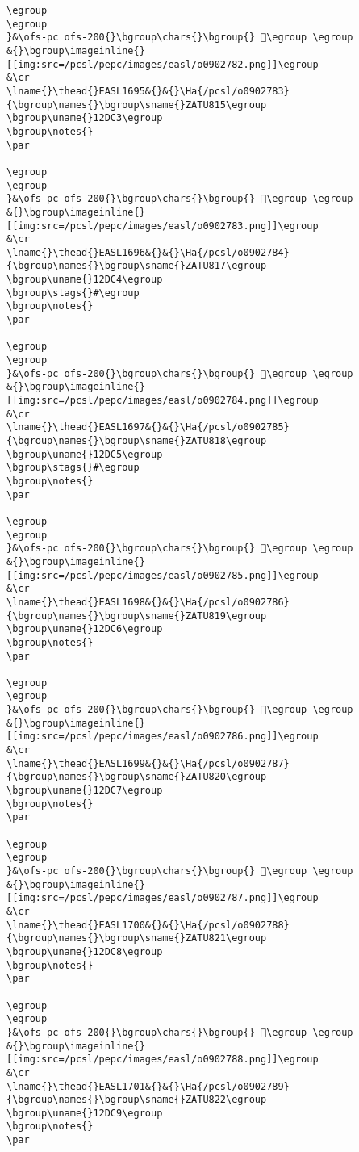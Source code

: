 \begin{verbatim}
\egroup
\egroup
}&\ofs-pc ofs-200{}\bgroup\chars{}\bgroup{} 𒷂\egroup \egroup
&{}\bgroup\imageinline{}[[img:src=/pcsl/pepc/images/easl/o0902782.png]]\egroup
&\cr
\lname{}\thead{}EASL1695&{}&{}\Ha{/pcsl/o0902783}{\bgroup\names{}\bgroup\sname{}ZATU815\egroup
\bgroup\uname{}12DC3\egroup
\bgroup\notes{}
\par 

\egroup
\egroup
}&\ofs-pc ofs-200{}\bgroup\chars{}\bgroup{} 𒷃\egroup \egroup
&{}\bgroup\imageinline{}[[img:src=/pcsl/pepc/images/easl/o0902783.png]]\egroup
&\cr
\lname{}\thead{}EASL1696&{}&{}\Ha{/pcsl/o0902784}{\bgroup\names{}\bgroup\sname{}ZATU817\egroup
\bgroup\uname{}12DC4\egroup
\bgroup\stags{}#\egroup
\bgroup\notes{}
\par 

\egroup
\egroup
}&\ofs-pc ofs-200{}\bgroup\chars{}\bgroup{} 𒷄\egroup \egroup
&{}\bgroup\imageinline{}[[img:src=/pcsl/pepc/images/easl/o0902784.png]]\egroup
&\cr
\lname{}\thead{}EASL1697&{}&{}\Ha{/pcsl/o0902785}{\bgroup\names{}\bgroup\sname{}ZATU818\egroup
\bgroup\uname{}12DC5\egroup
\bgroup\stags{}#\egroup
\bgroup\notes{}
\par 

\egroup
\egroup
}&\ofs-pc ofs-200{}\bgroup\chars{}\bgroup{} 𒷅\egroup \egroup
&{}\bgroup\imageinline{}[[img:src=/pcsl/pepc/images/easl/o0902785.png]]\egroup
&\cr
\lname{}\thead{}EASL1698&{}&{}\Ha{/pcsl/o0902786}{\bgroup\names{}\bgroup\sname{}ZATU819\egroup
\bgroup\uname{}12DC6\egroup
\bgroup\notes{}
\par 

\egroup
\egroup
}&\ofs-pc ofs-200{}\bgroup\chars{}\bgroup{} 𒷆\egroup \egroup
&{}\bgroup\imageinline{}[[img:src=/pcsl/pepc/images/easl/o0902786.png]]\egroup
&\cr
\lname{}\thead{}EASL1699&{}&{}\Ha{/pcsl/o0902787}{\bgroup\names{}\bgroup\sname{}ZATU820\egroup
\bgroup\uname{}12DC7\egroup
\bgroup\notes{}
\par 

\egroup
\egroup
}&\ofs-pc ofs-200{}\bgroup\chars{}\bgroup{} 𒷇\egroup \egroup
&{}\bgroup\imageinline{}[[img:src=/pcsl/pepc/images/easl/o0902787.png]]\egroup
&\cr
\lname{}\thead{}EASL1700&{}&{}\Ha{/pcsl/o0902788}{\bgroup\names{}\bgroup\sname{}ZATU821\egroup
\bgroup\uname{}12DC8\egroup
\bgroup\notes{}
\par 

\egroup
\egroup
}&\ofs-pc ofs-200{}\bgroup\chars{}\bgroup{} 𒷈\egroup \egroup
&{}\bgroup\imageinline{}[[img:src=/pcsl/pepc/images/easl/o0902788.png]]\egroup
&\cr
\lname{}\thead{}EASL1701&{}&{}\Ha{/pcsl/o0902789}{\bgroup\names{}\bgroup\sname{}ZATU822\egroup
\bgroup\uname{}12DC9\egroup
\bgroup\notes{}
\par 


\end{verbatim}
